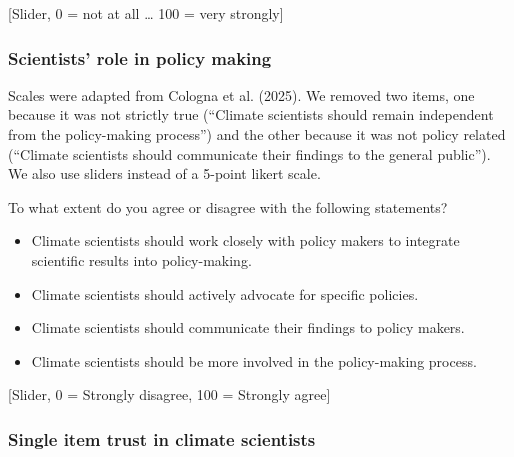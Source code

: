 \documentclass[
  letterpaper,
  DIV=11,
  numbers=noendperiod]{scrartcl}
\providecommand{\tightlist}{%
  \setlength{\itemsep}{0pt}\setlength{\parskip}{0pt}}
\begin{document}
{[}Slider, 0 = not at all \ldots{} 100 = very strongly{]}

\subsubsection{Scientists' role in policy
making}\label{scientists-role-in-policy-making}

\begin{tcolorbox}[enhanced jigsaw, toprule=.15mm, toptitle=1mm, colframe=quarto-callout-note-color-frame, leftrule=.75mm, rightrule=.15mm, bottomtitle=1mm, coltitle=black, colbacktitle=quarto-callout-note-color!10!white, bottomrule=.15mm, breakable, opacityback=0, titlerule=0mm, title=\textcolor{quarto-callout-note-color}{\faInfo}\hspace{0.5em}{Note}, left=2mm, arc=.35mm, opacitybacktitle=0.6, colback=white]

Scales were adapted from Cologna et al. (2025). We removed two items,
one because it was not strictly true (``Climate scientists should remain
independent from the policy-making process'') and the other because it
was not policy related (``Climate scientists should communicate their
findings to the general public''). We also use sliders instead of a
5-point likert scale.

\end{tcolorbox}

To what extent do you agree or disagree with the following statements?

\begin{itemize}
\tightlist
\item
  Climate scientists should work closely with policy makers to integrate
  scientific results into policy-making.
\item
  Climate scientists should actively advocate for specific policies.
\item
  Climate scientists should communicate their findings to policy makers.
\item
  Climate scientists should be more involved in the policy-making
  process.
\end{itemize}

{[}Slider, 0 = Strongly disagree, 100 = Strongly agree{]}

\subsubsection{Single item trust in climate
scientists}\label{single-item-trust-in-climate-scientists-1}
\end{document}
